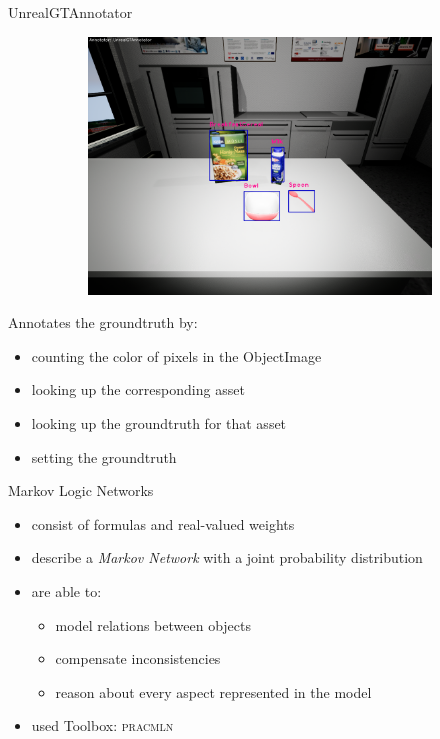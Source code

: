 \documentclass[]{beamer}
\begin{document}
\begin{frame}{UnrealGTAnnotator}
\begin{figure}
\begin{subfigure}[b]{0.3\textwidth}
		\includegraphics[scale=.08]{img/gt.png}	
	\end{subfigure}
\end{figure}
Annotates the groundtruth by:
	\begin{itemize}
		\item counting the color of pixels in the ObjectImage
		\item looking up the corresponding asset 
		\item looking up the groundtruth for that asset
		\item setting the groundtruth 
	\end{itemize}
\end{frame}


\begin{frame}{Markov Logic Networks}
	\begin{itemize}
		\item consist of formulas and real-valued weights
		\item describe a \textit{Markov Network} with a joint probability distribution
		\item are able to:
		\begin{itemize}
			\item model relations between objects
			\item compensate inconsistencies
			\item reason about every aspect represented in the model
		\end{itemize}
		\item used Toolbox: \textsc{pracmln}
	\end{itemize}
\end{frame}
\end{document}
